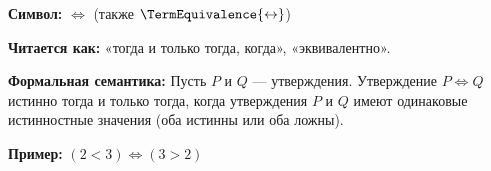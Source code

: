 
\hypertarget{axiom-equivalence}{}
\begin{object} %

\textbf{Символ:} $\iff$ (также $\TermEquivalence{\leftrightarrow}$)

\textbf{Читается как:} «тогда и только тогда, когда», «эквивалентно».

\textbf{Формальная семантика:}
Пусть $P$ и $Q$ — утверждения. Утверждение $P \iff Q$ истинно тогда и только тогда, когда утверждения $P$ и $Q$ имеют одинаковые истинностные значения (оба истинны или оба ложны).

\textbf{Пример:} $(2 < 3) \iff (3 > 2)$
\end{object}